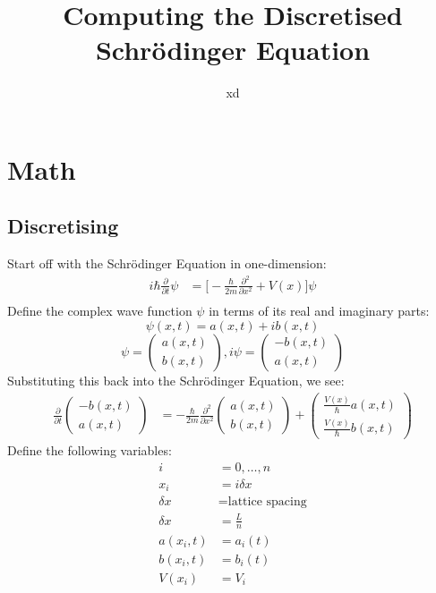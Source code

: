 \documentclass[11pt,letterpaper]{article}
\begin{document}
	\setlength{\parindent}{0pt}
	\setlength{\parskip}{1em}
	\title{Computing the Discretised Schr{\"o}dinger Equation}
	\author{xd}
	\maketitle

	\section{Math}
	\subsection{Discretising}
	Start off with the Schr{\"o}dinger Equation in one-dimension:
	\begin{align*}
		i \hbar \frac{\partial}{\partial t} \psi &= \Big[-\frac{\hbar}{2m}\frac{\partial^2}{\partial x^2} + V(x)\Big] \psi \\
	\end{align*}
	Define the complex wave function $\psi$ in terms of its real and imaginary parts:
		\[\psi(x,t) = a(x,t)+ib(x,t)\]
		\[\psi =
		\begin{pmatrix}
			a(x,t) \\
			b(x,t)
		\end{pmatrix},
		i\psi = 
		\begin{pmatrix}
			-b(x,t)\\
			a(x,t)
		\end{pmatrix}\]
	Substituting this back into the Schr{\"o}dinger Equation, we see:
	\begin{align*}
		\frac{\partial}{\partial t} 
		\begin{pmatrix}
			-b(x,t)\\
			a(x,t)
		\end{pmatrix} &= 
		-\frac{\hbar}{2m}\frac{\partial^2}{\partial x^2}
		\begin{pmatrix}
			a(x,t)\\
			b(x,t)
		\end{pmatrix}
		+
		\begin{pmatrix}
			\frac{V(x)}{\hbar} a(x,t)\\
			\frac{V(x)}{\hbar} b(x,t)
		\end{pmatrix}
	\end{align*}
	Define the following variables:
	\begin{align*}
		i &= 0,\ldots,n\\
		x_i  &=  i\delta x\\
		\delta x &= \text{lattice spacing}\\
		\delta x &= \frac{L}{n}\\
		a(x_i,t) &= a_i(t)\\
		b(x_i,t) &= b_i(t)\\
		V(x_i) &= V_i
	\end{align*}
\end{document}
